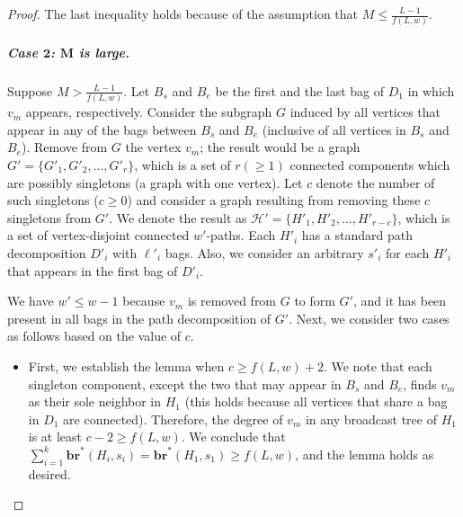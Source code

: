 \documentclass[letterpaper,11pt]{article}
\newcommand{\bropt}{{\boldsymbol{br}^*}}
\newcommand{\bigell}{L}
\newcommand{\pwidth}{w}
\begin{document}
\begin{proof}
    \scalebox{.9}{
\begin{minipage}{1.2\textwidth}
    \begin{align*}
        \sum_{i=1}^k \bropt(H_i, s_i)  = \bropt(H_1, s_1)\geq (\bigell-1)/M \geq f(\bigell, \pwidth).
    \end{align*}
    \vspace{1mm}
\end{minipage}}
    
    The last inequality holds because of the assumption that $M\leq \frac{\bigell - 1}{f(\bigell,\pwidth)}$.

    \subparagraph*{Case $\mathbf{2}$: $\mathbf{M}$ is large.} Suppose $M > \frac{\bigell - 1}{f(\bigell, \pwidth)}$. Let $B_s$ and $B_e$ be the first and the last bag of $D_1$ in which $v_m$ appears, respectively. 
   Consider the subgraph $G$ induced by all vertices that appear in any of the 
   bags between $B_s$ and $B_e$ (inclusive of all vertices in $B_s$ and $B_e$). 
    Remove from $G$ the vertex $v_m$; the result would be a graph $G' = \{G'_1,G'_2,\ldots, G'_r\}$, which is a set of  $r(\geq 1)$ connected components which are possibly singletons (a graph with one vertex). Let $c$ denote the number of such singletons ($c\geq 0$) and consider a graph resulting from removing these $c$ singletons from $G'$. We denote the result as $\mathcal{H'}=\{H'_1, H'_2, \ldots, H'_{r-c}\}$, which is a set of vertex-disjoint connected $\pwidth'$-paths. 
    Each $H'_i$ has a standard path decomposition $D'_i$ with $\ell'_i$ bags. Also, we consider an arbitrary $s'_i$ for each $H'_i$ that appears in the first bag of $D'_i$. 
    
    We have $\pwidth' \leq \pwidth-1$ because $v_m$ is removed from $G$ to form $G'$, and it has been present in all bags in the path decomposition of $G'$. Next, we consider two cases as follows based on the value of $c$.


\begin{itemize}
    \item 
    First, we establish the lemma when $c \geq f(\bigell, \pwidth) + 2$.
    We note that each singleton component, except the two that may appear in $B_s$ and $B_e$, finds $v_m$ as their sole neighbor in $H_1$ (this holds because all vertices that share a bag in $D_1$ are connected). Therefore, the degree of $v_m$ in any broadcast tree of $H_1$ is at least $c-2 \geq f(\bigell,\pwidth)$. We conclude that $    \sum_{i=1}^k \bropt(H_i, s_i)  = \bropt(H_1,s_1) \geq f(\bigell, \pwidth)$, and the lemma holds as desired. 


\end{itemize}
\end{proof}
\end{document}
